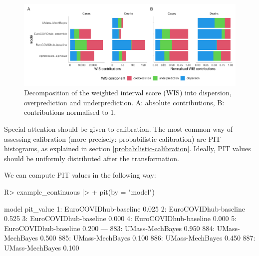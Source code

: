 \documentclass[
]{jss}
\begin{document}
\begin{CodeChunk}
\begin{figure}[!h]

{\centering \includegraphics[width=1\linewidth]{manuscript_files/figure-latex/wis-components-1} 

}

\caption[Decomposition of the weighted interval score (WIS) into dispersion, overprediction and underprediction]{Decomposition of the weighted interval score (WIS) into dispersion, overprediction and underprediction. A: absolute contributions, B: contributions normalised to 1.}\label{fig:wis-components}
\end{figure}
\end{CodeChunk}

Special attention should be given to calibration. The most common way of
assessing calibration (more precisely: probabilistic calibration) are
PIT histograms, as explained in section \ref{probabilistic-calibration}.
Ideally, PIT values should be uniformly distributed after the
transformation.

We can compute PIT values in the following way:

\begin{CodeChunk}
\begin{CodeInput}
R> example_continuous |>
+   pit(by = "model") 
\end{CodeInput}
\begin{CodeOutput}
                     model pit_value
  1: EuroCOVIDhub-baseline     0.025
  2: EuroCOVIDhub-baseline     0.525
  3: EuroCOVIDhub-baseline     0.000
  4: EuroCOVIDhub-baseline     0.000
  5: EuroCOVIDhub-baseline     0.200
 ---                                
883:       UMass-MechBayes     0.950
884:       UMass-MechBayes     0.500
885:       UMass-MechBayes     0.100
886:       UMass-MechBayes     0.450
887:       UMass-MechBayes     0.100
\end{CodeOutput}
\end{CodeChunk}
\end{document}

